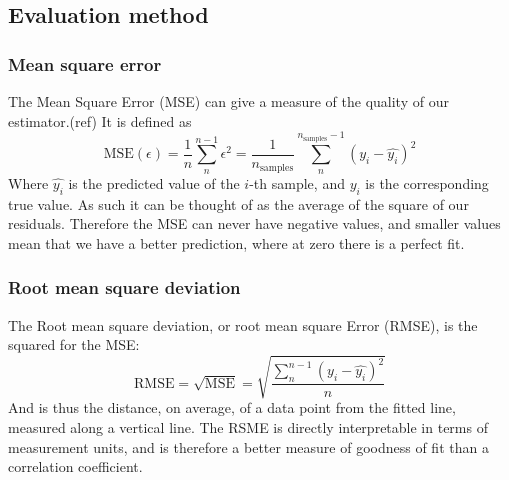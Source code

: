 	
	

\subsection{Evaluation method}\label{sec:evaluation_method} %

\subsubsection{Mean square error} 
 
The Mean Square Error (\ac{MSE}) can give a measure of the quality of our estimator.(ref) It is defined as
\begin{equation}\label{eq: mse}
	\text{MSE}(\epsilon) = \frac{1}{n}\sum_n^{n-1}\epsilon^2 = \frac{1}{n_\text{samples}} \sum_n^{n_{\text{samples}}-1}(y_i - \hat{y_i})^2
	\end{equation}
	Where $\hat{y_i}$ is the predicted value of the $i$-th sample, and $y_i$ is the corresponding true value.
As such it can be thought of  as the average of the square of our residuals. Therefore the MSE can never have negative values, and smaller values mean that we have a better prediction, where at zero there is a perfect fit.

\subsubsection{Root mean square deviation} 
The Root mean square deviation, or root mean square Error (\ac{RMSE}), is the squared for the MSE:
$$\text{RMSE} = \sqrt{\text{MSE}} =  \sqrt{\frac{\sum^{n-1}_{n}(y_{i}-\hat{y_{i}})^2 }{n}} $$
And is thus the distance, on average, of a data point from the fitted line, measured along a vertical line. The RSME is directly interpretable in terms of measurement units, and is therefore a better measure of goodness of fit than a correlation coefficient. 

